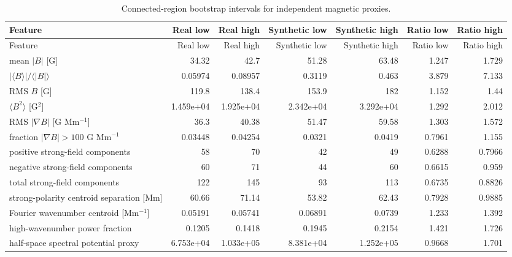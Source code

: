 \scriptsize
\setlength{\tabcolsep}{2pt}
\begin{longtable}{p{}rrrrrr}
\caption{Connected-region bootstrap intervals for independent magnetic proxies.}\label{tab:physics-proxy-bootstrap}\\
\toprule
Feature & Real low & Real high & Synthetic low & Synthetic high & Ratio low & Ratio high\\
\midrule
\endfirsthead
\toprule
Feature & Real low & Real high & Synthetic low & Synthetic high & Ratio low & Ratio high\\
\midrule
\endhead
mean $|B|$ [G] & 34.32 & 42.7 & 51.28 & 63.48 & 1.247 & 1.729\\
$|\langle B\rangle|/\langle|B|\rangle$ & 0.05974 & 0.08957 & 0.3119 & 0.463 & 3.879 & 7.133\\
RMS $B$ [G] & 119.8 & 138.4 & 153.9 & 182 & 1.152 & 1.44\\
$\langle B^2\rangle$ [G$^2$] & 1.459e+04 & 1.925e+04 & 2.342e+04 & 3.292e+04 & 1.292 & 2.012\\
RMS $|\nabla B|$ [G Mm$^{-1}$] & 36.3 & 40.38 & 51.47 & 59.58 & 1.303 & 1.572\\
fraction $|\nabla B|>100$ G Mm$^{-1}$ & 0.03448 & 0.04254 & 0.0321 & 0.0419 & 0.7961 & 1.155\\
positive strong-field components & 58 & 70 & 42 & 49 & 0.6288 & 0.7966\\
negative strong-field components & 60 & 71 & 44 & 60 & 0.6615 & 0.959\\
total strong-field components & 122 & 145 & 93 & 113 & 0.6735 & 0.8826\\
strong-polarity centroid separation [Mm] & 60.66 & 71.14 & 53.82 & 62.43 & 0.7928 & 0.9885\\
Fourier wavenumber centroid [Mm$^{-1}$] & 0.05191 & 0.05741 & 0.06891 & 0.0739 & 1.233 & 1.392\\
high-wavenumber power fraction & 0.1205 & 0.1418 & 0.1945 & 0.2154 & 1.421 & 1.726\\
half-space spectral potential proxy & 6.753e+04 & 1.033e+05 & 8.381e+04 & 1.252e+05 & 0.9668 & 1.701\\
\bottomrule
\end{longtable}
\setlength{\tabcolsep}{6pt}
\normalsize
